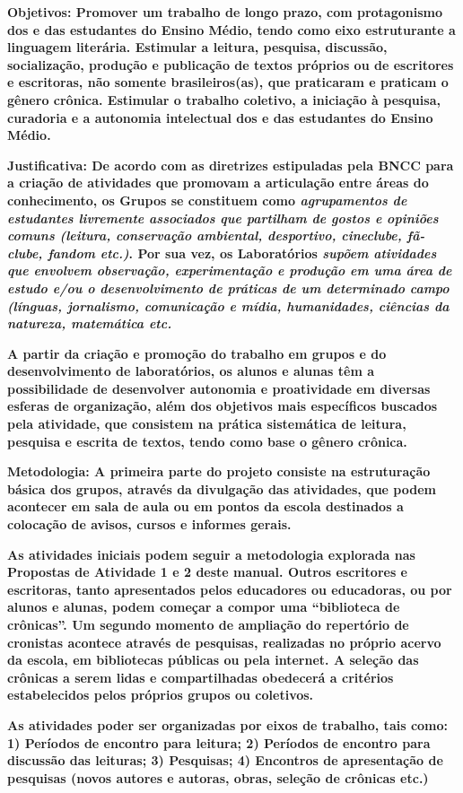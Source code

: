 \textbf{Objetivos: Promover um trabalho de longo prazo, com protagonismo
dos e das estudantes do Ensino Médio, tendo como eixo estruturante a
linguagem literária. Estimular a leitura, pesquisa, discussão,
socialização, produção e publicação de textos próprios ou de escritores
e escritoras, não somente brasileiros(as), que praticaram e praticam o
gênero crônica. Estimular o trabalho coletivo, a iniciação à pesquisa,
curadoria e a autonomia intelectual dos e das estudantes do Ensino
Médio. }

\textbf{Justificativa: De acordo com as diretrizes estipuladas pela BNCC
para a criação de atividades que promovam a articulação entre áreas do
conhecimento, os Grupos se constituem como \emph{agrupamentos de
estudantes livremente associados que partilham de gostos e opiniões
comuns (leitura, conservação ambiental, desportivo, cineclube, fã-clube,
fandom etc.)}. Por sua vez, os Laboratórios \emph{supõem atividades que
envolvem observação, experimentação e produção em uma área de estudo
e/ou o desenvolvimento de práticas de um determinado campo (línguas,
jornalismo, comunicação e mídia, humanidades, ciências da natureza,
matemática etc.}}

\textbf{A partir da criação e promoção do trabalho em grupos e do
desenvolvimento de laboratórios, os alunos e alunas têm a possibilidade
de desenvolver autonomia e proatividade em diversas esferas de
organização, além dos objetivos mais específicos buscados pela
atividade, que consistem na prática sistemática de leitura, pesquisa e
escrita de textos, tendo como base o gênero crônica.}

\textbf{Metodologia: A primeira parte do projeto consiste na
estruturação básica dos grupos, através da divulgação das atividades,
que podem acontecer em sala de aula ou em pontos da escola destinados a
colocação de avisos, cursos e informes gerais. }

\textbf{As atividades iniciais podem seguir a metodologia explorada nas
Propostas de Atividade 1 e 2 deste manual. Outros escritores e
escritoras, tanto apresentados pelos educadores ou educadoras, ou por
alunos e alunas, podem começar a compor uma ``biblioteca de crônicas''.
Um segundo momento de ampliação do repertório de cronistas acontece
através de pesquisas, realizadas no próprio acervo da escola, em
bibliotecas públicas ou pela internet. A seleção das crônicas a serem
lidas e compartilhadas obedecerá a critérios estabelecidos pelos
próprios grupos ou coletivos.}

\textbf{As atividades poder ser organizadas por eixos de trabalho, tais
como: 1) Períodos de encontro para leitura; 2) Períodos de encontro para
discussão das leituras; 3) Pesquisas; 4) Encontros de apresentação de
pesquisas (novos autores e autoras, obras, seleção de crônicas etc.)}

